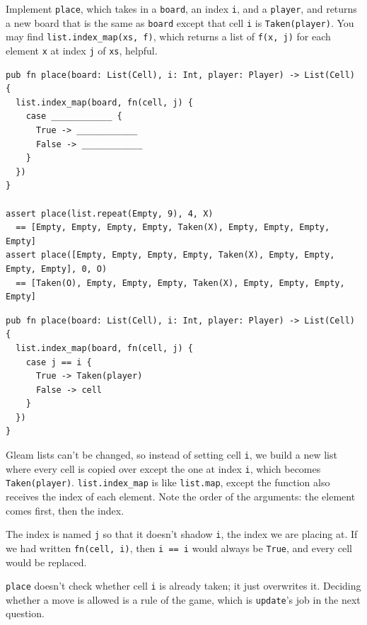\begin{blocksection}
\question Implement \texttt{place}, which takes in a \texttt{board}, an index \texttt{i}, and a \texttt{player}, and returns a new board that is the same as \texttt{board} except that cell \texttt{i} is \lstinline{Taken(player)}. You may find \lstinline{list.index_map(xs, f)}, which returns a list of \lstinline{f(x, j)} for each element \texttt{x} at index \texttt{j} of \texttt{xs}, helpful.
\begin{lstlisting}
pub fn place(board: List(Cell), i: Int, player: Player) -> List(Cell) {
  list.index_map(board, fn(cell, j) {
    case ____________ {
      True -> ____________
      False -> ____________
    }
  })
}

assert place(list.repeat(Empty, 9), 4, X)
  == [Empty, Empty, Empty, Empty, Taken(X), Empty, Empty, Empty, Empty]
assert place([Empty, Empty, Empty, Empty, Taken(X), Empty, Empty, Empty, Empty], 0, O)
  == [Taken(O), Empty, Empty, Empty, Taken(X), Empty, Empty, Empty, Empty]
\end{lstlisting}

\begin{solution}
\begin{lstlisting}
pub fn place(board: List(Cell), i: Int, player: Player) -> List(Cell) {
  list.index_map(board, fn(cell, j) {
    case j == i {
      True -> Taken(player)
      False -> cell
    }
  })
}
\end{lstlisting}
\end{solution}

\begin{questionmeta}
  Gleam lists can't be changed, so instead of setting cell \texttt{i}, we build a new list where every cell is copied over except the one at index \texttt{i}, which becomes \lstinline{Taken(player)}. \lstinline{list.index_map} is like \lstinline{list.map}, except the function also receives the index of each element. Note the order of the arguments: the element comes first, then the index.

  The index is named \texttt{j} so that it doesn't shadow \texttt{i}, the index we are placing at. If we had written \lstinline{fn(cell, i)}, then \lstinline{i == i} would always be \lstinline{True}, and every cell would be replaced.

  \texttt{place} doesn't check whether cell \texttt{i} is already taken; it just overwrites it. Deciding whether a move is allowed is a rule of the game, which is \texttt{update}'s job in the next question.
\end{questionmeta}
\end{blocksection}
